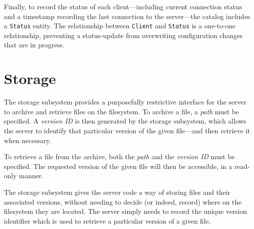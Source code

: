 Finally, to record the status of each client---including current connection
status and a timestamp recording the last connection to the server---the
catalog includes a \verb!Status! entity. The relationship between \verb!Client!
and \verb!Status! is a one-to-one relationship, preventing a status-update from
overwriting configuration changes that are in progress.

\section{Storage}

The storage subsystem provides a purposefully restrictive interface for the
server to archive and retrieve files on the filesystem. To archive a file,
a \emph{path} must be specified. A \emph{version ID} is then generated by the
storage subsystem, which allows the server to identify that particular version
of the given file---and then retrieve it when necessary.

To retrieve a file from the archive, both the \emph{path} and the \emph{version
ID} must be specified. The requested version of the given file will then be
accessible, in a read-only manner.

The storage subsystem gives the server code a way of storing files and their
associated versions, without needing to decide (or indeed, record) where on the
filesystem they are located. The server simply needs to record the unique
version identifier which is used to retrieve a particular version of a given
file.
